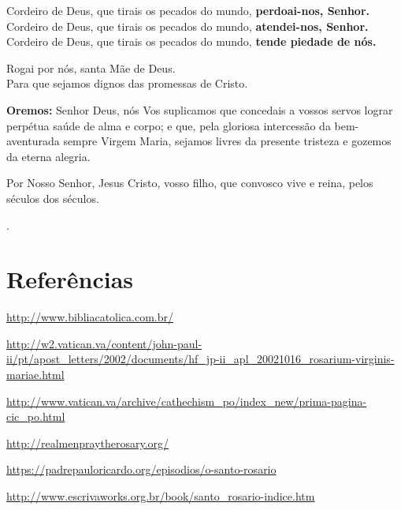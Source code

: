 \documentclass{rosario}
\begin{document}
Cordeiro de Deus, que tirais os pecados do mundo, \textbf{perdoai-nos, Senhor.} \\
Cordeiro de Deus, que tirais os pecados do mundo, \textbf{atendei-nos, Senhor.} \\
Cordeiro de Deus, que tirais os pecados do mundo, \textbf{tende piedade de nós.}

Rogai por nós, santa Mãe de Deus. \\
Para que sejamos dignos das promessas de Cristo.

\textbf{Oremos:}
Senhor Deus, nós Vos suplicamos que concedais a vossos servos lograr perpétua saúde de alma e corpo;
e que, pela gloriosa intercessão da bem-aventurada sempre Virgem Maria, sejamos livres da presente tristeza e gozemos da eterna alegria.

Por Nosso Senhor, Jesus Cristo, vosso filho, que convosco vive e reina, pelos séculos dos séculos.

\amen.


\chapter{Referências}


\url{http://www.bibliacatolica.com.br/}


\url{http://w2.vatican.va/content/john-paul-ii/pt/apost_letters/2002/documents/hf_jp-ii_apl_20021016_rosarium-virginis-mariae.html}


\url{http://www.vatican.va/archive/cathechism_po/index_new/prima-pagina-cic_po.html}


\url{http://realmenpraytherosary.org/}


\url{https://padrepauloricardo.org/episodios/o-santo-rosario}


\url{http://www.escrivaworks.org.br/book/santo_rosario-indice.htm}

\end{document}
